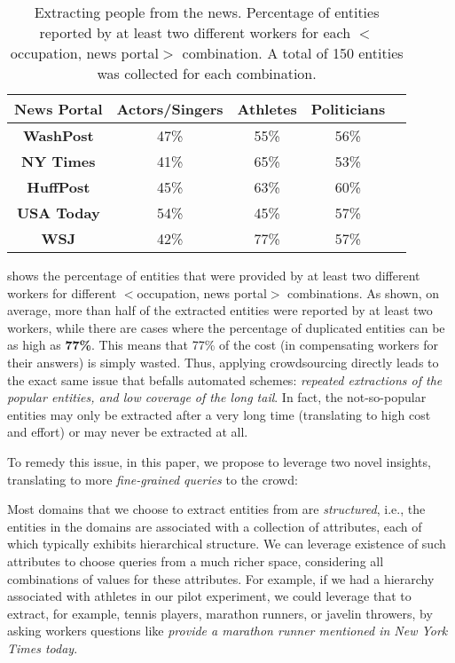 \vspace{10pt}\begin{table}[h]
\center
\vspace{-10pt}
\caption{Extracting people from the news. Percentage of entities reported by at least two different workers for each $<$occupation, news portal$>$ combination. A total of 150 entities was collected for each combination.}
\label{tab:duplicates}
\begin{tabular}{|c|c|c|c|c|}
\hline
News Portal & {\bf Actors/Singer}s & {\bf Athletes} & \textbf{Politicians}\\ \hline
{\bf WashPost} & 47\% & 55\% & 56\% \\
{\bf NY Times} & 41\%& 65\% & 53\% \\
{\bf HuffPost} & 45\% & 63\% & 60\% \\
{\bf USA Today} & 54\% & 45\% & 57\% \\
{\bf WSJ} & 42\% & 77\% & 57\% \\
\hline
\end{tabular}
\end{table}

\noindent {} shows the percentage of entities that were provided by at 
least two different workers for different $<$occupation, news portal$>$ 
combinations. 
As shown, on average, more than half of the extracted entities were reported by at least two workers, 
while there are cases where the percentage of duplicated entities can be as high as {\bf 77\%}. 
This means that 77\% of the cost (in compensating workers for their answers) is simply wasted. 
Thus, applying crowdsourcing directly leads to the 
exact same issue that befalls automated schemes: 
{\em repeated extractions of the popular entities, and low coverage of the long tail}.
In fact, the not-so-popular entities may only be extracted after a very long time
(translating to high cost and effort) or may never be extracted at all.

 To remedy this issue, in this paper, we propose to 
leverage two novel insights, translating to more {\em fine-grained
queries} to the crowd:

Most domains that we choose to extract entities from are {\em structured}, i.e., 
the entities in the domains are associated with a collection of attributes, 
each of which typically exhibits hierarchical structure. 
We can leverage existence of such attributes to choose queries from a much richer space, 
considering all combinations of values for these attributes.
For example, if we had a hierarchy associated with athletes in our
pilot experiment, we could
leverage that to extract, for example, tennis players, marathon runners,
or javelin throwers, by asking workers questions like {\em provide a marathon runner mentioned
in New York Times today}.

